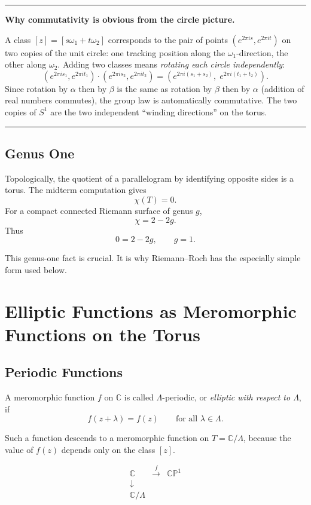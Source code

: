 \documentclass[11pt]{article}
\newcommand{\C}{\mathbb{C}}
\newcommand{\CP}{\mathbb{CP}}
\newenvironment{keyidea}[1]{%
  \par\medskip
  \begin{center}
  \begin{minipage}{0.92\textwidth}
  \hrule
  \smallskip
  \textbf{#1.}\quad\ignorespaces
}{%
  \smallskip
  \hrule
  \end{minipage}
  \end{center}
  \medskip
}
\begin{document}
\begin{keyidea}{Why commutativity is obvious from the circle picture}
A class \([z]=[s\omega_1+t\omega_2]\) corresponds to the pair of points
\((e^{2\pi is}, e^{2\pi it})\) on two copies of the unit circle: one
tracking position along the \(\omega_1\)-direction, the other along
\(\omega_2\).  Adding two classes means \emph{rotating each circle
independently}:
\[
(e^{2\pi is_1},e^{2\pi it_1})\cdot(e^{2\pi is_2},e^{2\pi it_2})
= (e^{2\pi i(s_1+s_2)},\;e^{2\pi i(t_1+t_2)}).
\]
Since rotation by \(\alpha\) then by \(\beta\) is the same as rotation by
\(\beta\) then by \(\alpha\) (addition of real numbers commutes), the
group law is automatically commutative.  The two copies of \(S^1\) are
the two independent ``winding directions'' on the torus.
\end{keyidea}

\subsection{Genus One}

Topologically, the quotient of a parallelogram by identifying opposite sides
is a torus.  The midterm computation gives
\[
\chi(T)=0.
\]
For a compact connected Riemann surface of genus \(g\),
\[
\chi=2-2g.
\]
Thus
\[
0=2-2g,
\qquad
g=1.
\]

This genus-one fact is crucial.  It is why Riemann--Roch has the especially
simple form used below.

\section{Elliptic Functions as Meromorphic Functions on the Torus}

\subsection{Periodic Functions}

A meromorphic function \(f\) on \(\C\) is called \(\Lambda\)-periodic, or
\emph{elliptic with respect to \(\Lambda\)}, if
\[
f(z+\lambda)=f(z)
\qquad
\text{for all }\lambda\in\Lambda.
\]

Such a function descends to a meromorphic function on \(T=\C/\Lambda\),
because the value of \(f(z)\) depends only on the class \([z]\).

\[
\begin{array}{ccc}
\C & \xrightarrow{\ f\ } & \CP^1\\
\downarrow & & \\
\C/\Lambda &&
\end{array}
\]
\end{document}
